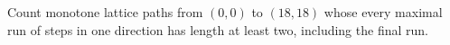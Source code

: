 Count monotone lattice paths from $(0,0)$ to $(18,18)$ whose every maximal run of steps in one direction has length at least two, including the final run.
